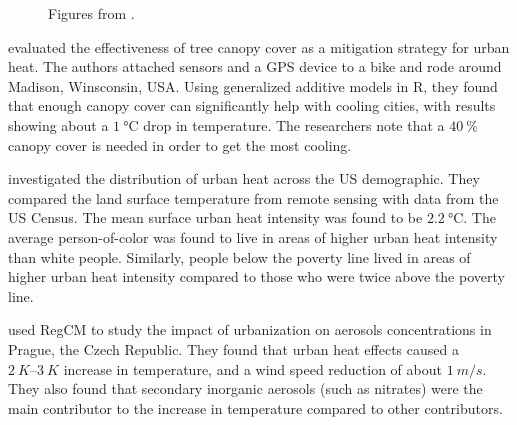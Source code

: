 		\begin{figure}
			\centering
			\hfill
			
			\caption{Figures from \textcite{Karlicky2018}.}
			\label{fig:rrl-karlicky2018-dailytemps}
		\end{figure}
		
		\textcite{Ziter2019} evaluated the effectiveness of tree canopy cover as a mitigation strategy for urban heat.
		The authors attached sensors and a GPS device to a bike and rode around Madison, Winsconsin, USA.
		Using generalized additive models in R, they found that enough canopy cover can significantly help with cooling cities, 
			with results showing about a $\qty{1}{\degreeCelsius}$ drop in temperature.
		The researchers note that a $\qty{40}{\percent}$ canopy cover is needed in order to get the most cooling.
		
		\textcite{Hsu2021} investigated the distribution of urban heat across the US demographic. 
		They compared the land surface temperature from remote sensing with data from the US Census.
		The mean surface urban heat intensity was found to be $\qty{2.2}{\degreeCelsius}$.
		The average person-of-color was found to live in areas of higher urban heat intensity than white people.
		Similarly, people below the poverty line lived in areas of higher urban heat intensity compared to those who were twice above the poverty line.
		
		\textcite{Huszar2018} used RegCM to study the impact of urbanization on aerosols concentrations in Prague, the Czech Republic.
		They found that urban heat effects caused a $\qtyrange{2}{3}{K}$ increase in temperature, and a wind speed reduction of about $\qty{1}{m/s}$.
		They also found that secondary inorganic aerosols (such as nitrates) were the main contributor to the increase in temperature compared to other contributors.
		
